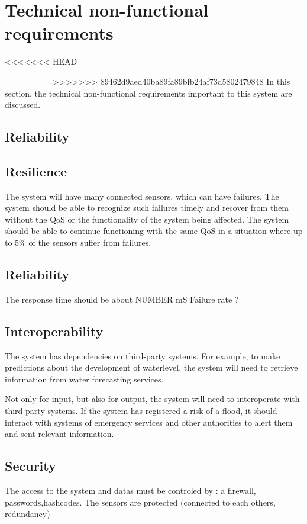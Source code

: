 \section{Technical non-functional requirements}
<<<<<<< HEAD

=======
>>>>>>> 89462d9aed40ba89fa89bfb24af73d5802479848
In this section, the technical non-functional requirements important to this system are discussed.

\subsection{Reliability}

\subsection{Resilience}
The system will have many connected sensors, which can have failures. 
The system should be able to recognize such failures timely and recover from them without the QoS or the functionality of the system being affected. 
The system should be able to continue functioning with the same QoS in a situation where up to 5\% of the sensors suffer from failures.  %

\subsection{Reliability}
The response time should be about NUMBER mS
Failure rate ?

\subsection{Interoperability}
The system has dependencies on third-party systems. For example, to make predictions about the development of waterlevel, the system will need to retrieve information from water forecasting services. 

Not only for input, but also for output, the system will need to interoperate with third-party systems. If the system has registered a risk of a flood, it should interact with systems of emergency services and other authorities to alert them and sent relevant information.

\subsection{Security}
The access to the system and datas must be controled by : a firewall, passwords,hashcodes.
The sensors are protected (connected to each others, redundancy)

